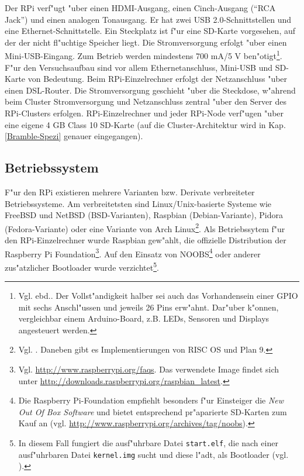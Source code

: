 Der RPi verf"ugt "uber einen HDMI-Ausgang, einen Cinch-Ausgang ("`RCA Jack"') und einen analogen Tonausgang. Er hat zwei USB 2.0-Schnittstellen und eine Ethernet-Schnittstelle. Ein Steckplatz ist f"ur eine SD-Karte vorgesehen, auf der der nicht fl"uchtige Speicher liegt. Die Stromversorgung erfolgt "uber einen Mini-USB-Eingang. Zum Betrieb werden mindestens 700 mA/5 V ben"otigt\footnote{Vgl. ebd.. Der Vollst"andigkeit halber sei auch das Vorhandensein einer GPIO mit sechs Anschl"ussen und jeweils 26 Pins erw"ahnt. Dar"uber k"onnen, vergleichbar einem Arduino-Board, z.B. LEDs, Sensoren und Displays angesteuert werden.}. 
\enlargethispage*{2cm}
\noindent
F"ur den Versuchsaufbau sind vor allem Ethernetanschluss, Mini-USB und SD-Karte von Bedeutung. Beim RPi-Einzelrechner erfolgt der Netzanschluss "uber einen DSL-Router. Die Stromversorgung geschieht "uber die Steckdose, w"ahrend beim Cluster Stromversorgung und Netzanschluss zentral "uber den Server des RPi-Clusters erfolgen. RPi-Einzelrechner und jeder RPi-Node verf"ugen "uber eine eigene 4 GB Class 10 SD-Karte (auf die Cluster-Architektur wird in Kap. \ref{Bramble-Spezi} genauer eingegangen).

\subsection{Betriebssystem}\label{RPi-OS}

F"ur den RPi existieren mehrere Varianten bzw. Derivate verbreiteter Betriebssysteme. Am verbreitetsten sind Linux/Unix-basierte Systeme wie FreeBSD und NetBSD (BSD-Varianten), Raspbian (Debian-Variante), Pidora (Fedora-Variante) oder eine Variante von Arch Linux\footnote{Vgl. \cite{pow12}. Daneben gibt es Implementierungen von RISC OS und Plan 9.}. Als Betriebssytem f"ur den RPi-Einzelrechner wurde Raspbian gew"ahlt, die offizielle Distribution der Raspberry Pi Foundation\footnote{Vgl. \url{http://www.raspberrypi.org/faqs}. Das verwendete Image findet sich unter \url{http://downloads.raspberrypi.org/raspbian_latest}.}. Auf den Einsatz von NOOBS\footnote{Die Raspberry Pi-Foundation empfiehlt besonders f"ur Einsteiger die \textit{New Out Of Box Software} und bietet entsprechend pr"aparierte SD-Karten zum Kauf an (vgl. \url{http://www.raspberrypi.org/archives/tag/noobs}).} oder anderer zus"atzlicher Bootloader wurde verzichtet\footnote{In diesem Fall fungiert die ausf"uhrbare Datei \texttt{start.elf}, die nach einer ausf"uhrbaren Datei \texttt{kernel.img} sucht und diese l"adt, als Bootloader (vgl. \cite{kli13}).}.

